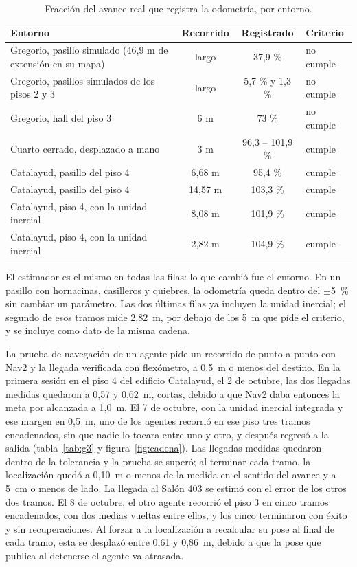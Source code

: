 \begin{table}[H]
  \centering\footnotesize
  \caption{Fracción del avance real que registra la odometría, por entorno.}
  \label{tab:odometria}
  \begin{tabular}{@{}p{}ccl@{}}
    \toprule
    \textbf{Entorno} & \textbf{Recorrido} & \textbf{Registrado} & \textbf{Criterio} \\ \midrule
    Gregorio, pasillo simulado (46,9 m de extensión en su mapa) & largo & 37,9 \% & no cumple \\
    Gregorio, pasillos simulados de los pisos 2 y 3 & largo & 5,7 \% y 1,3 \% & no cumple \\
    Gregorio, hall del piso 3 & 6 m & 73 \% & no cumple \\
    Cuarto cerrado, desplazado a mano & 3 m & 96,3 -- 101,9 \% & cumple \\
    Catalayud, pasillo del piso 4 & 6,68 m & 95,4 \% & cumple \\
    Catalayud, pasillo del piso 4 & 14,57 m & 103,3 \% & cumple \\
    Catalayud, piso 4, con la unidad inercial & 8,08 m & 101,9 \% & cumple \\
    Catalayud, piso 4, con la unidad inercial & 2,82 m & 104,9 \% & cumple \\ \bottomrule
  \end{tabular}
\end{table}

El estimador es el mismo en todas las filas: lo que cambió fue el entorno. En un pasillo con hornacinas, casilleros y quiebres, la odometría queda dentro del $\pm$5~\% sin cambiar un parámetro. Las dos últimas filas ya incluyen la unidad inercial; el segundo de esos tramos mide 2,82~m, por debajo de los 5~m que pide el criterio, y se incluye como dato de la misma cadena.

La prueba de navegación de un agente pide un recorrido de punto a punto con Nav2 y la llegada verificada con flexómetro, a 0,5~m o menos del destino. En la primera sesión en el piso 4 del edificio Catalayud, el 2 de octubre, las dos llegadas medidas quedaron a 0,57 y 0,62~m, cortas, debido a que Nav2 daba entonces la meta por alcanzada a 1,0~m. El 7 de octubre, con la unidad inercial integrada y ese margen en 0,5~m, uno de los agentes recorrió en ese piso tres tramos encadenados, sin que nadie lo tocara entre uno y otro, y después regresó a la salida (tabla~\ref{tab:g3} y figura~\ref{fig:cadena}). Las llegadas medidas quedaron dentro de la tolerancia y la prueba se superó; al terminar cada tramo, la localización quedó a 0,10~m o menos de la medida en el sentido del avance y a 5~cm o menos de lado. La llegada al Salón 403 se estimó con el error de los otros dos tramos. El 8 de octubre, el otro agente recorrió el piso 3 en cinco tramos encadenados, con dos medias vueltas entre ellos, y los cinco terminaron con éxito y sin recuperaciones. Al forzar a la localización a recalcular su pose al final de cada tramo, esta se desplazó entre 0,61 y 0,86~m, debido a que la pose que publica al detenerse el agente va atrasada.

